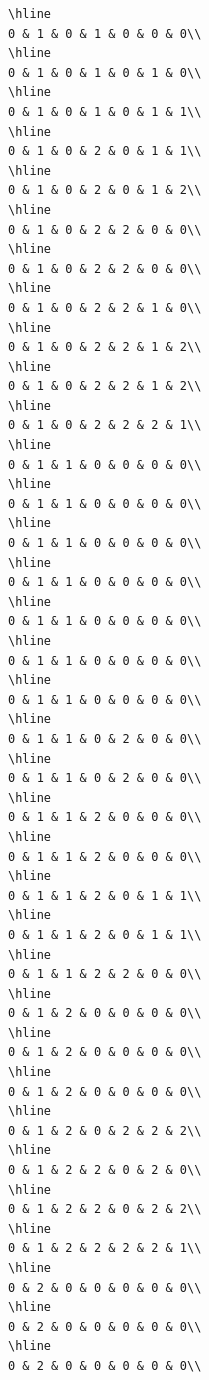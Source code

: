 \documentclass[
]{article}
\begin{document}
\begin{verbatim}
\hline
0 & 1 & 0 & 1 & 0 & 0 & 0\\
\hline
0 & 1 & 0 & 1 & 0 & 1 & 0\\
\hline
0 & 1 & 0 & 1 & 0 & 1 & 1\\
\hline
0 & 1 & 0 & 2 & 0 & 1 & 1\\
\hline
0 & 1 & 0 & 2 & 0 & 1 & 2\\
\hline
0 & 1 & 0 & 2 & 2 & 0 & 0\\
\hline
0 & 1 & 0 & 2 & 2 & 0 & 0\\
\hline
0 & 1 & 0 & 2 & 2 & 1 & 0\\
\hline
0 & 1 & 0 & 2 & 2 & 1 & 2\\
\hline
0 & 1 & 0 & 2 & 2 & 1 & 2\\
\hline
0 & 1 & 0 & 2 & 2 & 2 & 1\\
\hline
0 & 1 & 1 & 0 & 0 & 0 & 0\\
\hline
0 & 1 & 1 & 0 & 0 & 0 & 0\\
\hline
0 & 1 & 1 & 0 & 0 & 0 & 0\\
\hline
0 & 1 & 1 & 0 & 0 & 0 & 0\\
\hline
0 & 1 & 1 & 0 & 0 & 0 & 0\\
\hline
0 & 1 & 1 & 0 & 0 & 0 & 0\\
\hline
0 & 1 & 1 & 0 & 0 & 0 & 0\\
\hline
0 & 1 & 1 & 0 & 2 & 0 & 0\\
\hline
0 & 1 & 1 & 0 & 2 & 0 & 0\\
\hline
0 & 1 & 1 & 2 & 0 & 0 & 0\\
\hline
0 & 1 & 1 & 2 & 0 & 0 & 0\\
\hline
0 & 1 & 1 & 2 & 0 & 1 & 1\\
\hline
0 & 1 & 1 & 2 & 0 & 1 & 1\\
\hline
0 & 1 & 1 & 2 & 2 & 0 & 0\\
\hline
0 & 1 & 2 & 0 & 0 & 0 & 0\\
\hline
0 & 1 & 2 & 0 & 0 & 0 & 0\\
\hline
0 & 1 & 2 & 0 & 0 & 0 & 0\\
\hline
0 & 1 & 2 & 0 & 2 & 2 & 2\\
\hline
0 & 1 & 2 & 2 & 0 & 2 & 0\\
\hline
0 & 1 & 2 & 2 & 0 & 2 & 2\\
\hline
0 & 1 & 2 & 2 & 2 & 2 & 1\\
\hline
0 & 2 & 0 & 0 & 0 & 0 & 0\\
\hline
0 & 2 & 0 & 0 & 0 & 0 & 0\\
\hline
0 & 2 & 0 & 0 & 0 & 0 & 0\\

\end{verbatim}
\end{document}
